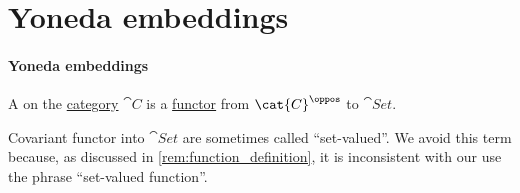 \section{Yoneda embeddings}\label{sec:yoneda_embeddings}

\paragraph{Yoneda embeddings}

\begin{definition}\label{def:presheaf}
  A  on the \hyperref[def:category]{category} \( \cat{C} \) is a \hyperref[def:functor]{functor} from \( \cat{C}^\oppos \) to \hyperref[def:category_of_small_sets]{\( \cat{Set} \)}.
\end{definition}
\begin{comments}
  \item Covariant functor into \( \cat{Set} \) are sometimes called \enquote{set-valued}. We avoid this term because, as discussed in \cref{rem:function_definition}, it is inconsistent with our use the phrase \enquote{set-valued function}.
\end{comments}

\smallskip

